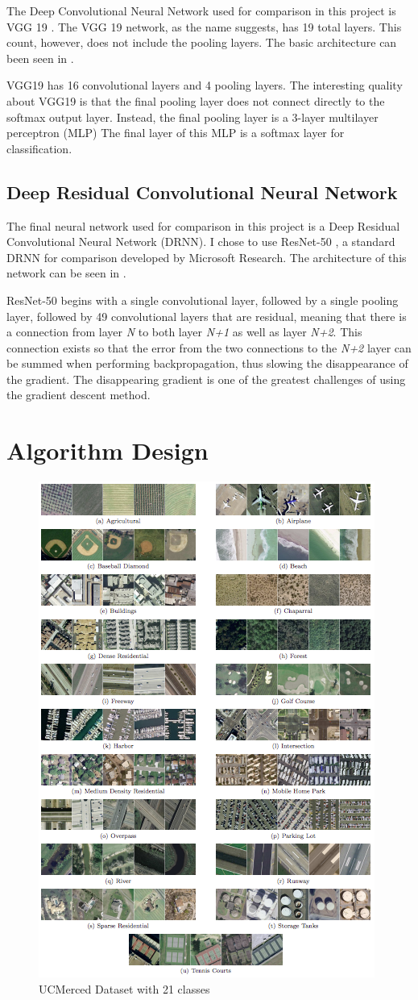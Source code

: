 \documentclass[12pt]{article}
\begin{document}
The Deep Convolutional Neural Network used for comparison in this project is VGG 19 \cite{vgg}. The VGG 19 network, as the name suggests, has 19 total layers. This count, however, does not include the pooling layers. The basic architecture can been seen in . 

VGG19 has 16 convolutional layers and 4 pooling layers. The interesting quality about VGG19 is that the final pooling layer does not connect directly to the softmax output layer. Instead, the final pooling layer is a 3-layer multilayer perceptron (MLP) \cite{ci_book} The final layer of this MLP is a softmax layer for classification. 

		\subsection{Deep Residual Convolutional Neural Network}

The final neural network used for comparison in this project is a Deep Residual Convolutional Neural Network (DRNN). I chose to use ResNet-50 \cite{resnet50}, a standard DRNN for comparison developed by Microsoft Research. The architecture of this network can be seen in .

ResNet-50 begins with a single convolutional layer, followed by a single pooling layer, followed by 49 convolutional layers that are residual, meaning that there is a connection from layer \textit{N} to both layer \textit{N+1} as well as layer \textit{N+2}. This connection exists so that the error from the two connections to the \textit{N+2} layer can be summed when performing backpropagation, thus slowing the disappearance of the gradient. The disappearing gradient is one of the greatest challenges of using the gradient descent method. 
	
	\section{Algorithm Design}
	
	\begin{figure}[t!]
		\centering
		\includegraphics[width=0.5\linewidth]{img/ucm.png}
		\caption{UCMerced Dataset with 21 classes}
		\label{fig:ucm}
	\end{figure}
	
\end{document}

